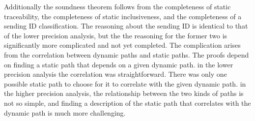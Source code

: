 \documentclass[10pt]{article}
\begin{document}
Additionally the soundness theorem follows from the completeness of static traceability,
the completeness of static inclusiveness, and the completeness of a sending ID classification. 
The reasoning about the sending ID is identical to that of the lower precision analysis, but
the the reasoning for the former two is significantly more complicated and not yet completed.
The complication arises from the
correlation between dynamic paths and static paths.  The proofs depend on finding a static 
path that depends on a given dynamic path. in the lower precision analysis the
correlation was straightforward. There was only one possible static path to choose for it
to correlate with the given dynamic path. in the higher precision analysis, the relationship
between the two kinds of paths is not so simple, and finding a description of the static path
that correlates with the dynamic path is much more challenging.
\end{document}
